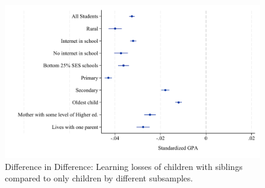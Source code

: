\documentclass[AER]{AEA}
\begin{document}
\begin{figure}[htbp]
    \centering
    
        \centering
        \includegraphics[width=\textwidth]{./FIGURES/TWFE/covid_twfe_summ_all_all_gpa_m_adj_4.pdf}
        
    
    \caption{Difference in Difference: Learning losses of children with siblings compared to only children by different subsamples.}\label{fig:twfe}
\end{figure}
\end{document}
